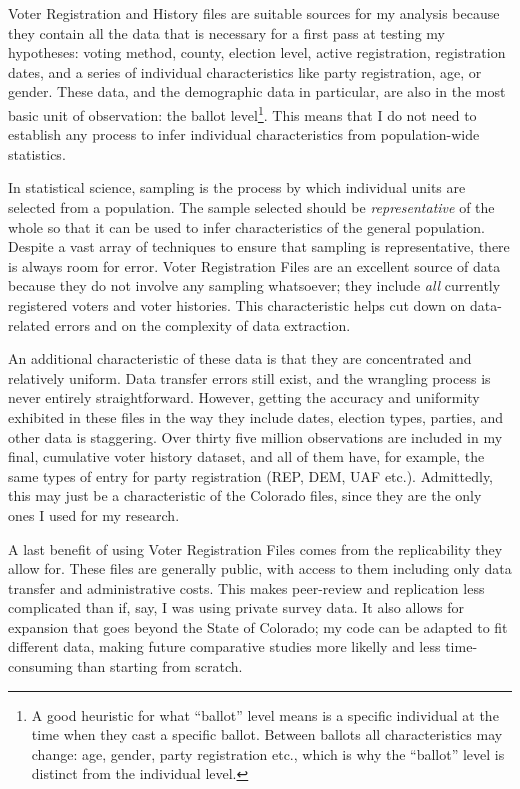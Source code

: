 \documentclass[12pt,twoside]{reedthesis}
\begin{document}
  Voter Registration and History files are suitable sources for my
  analysis because they contain all the data that is necessary for a first
  pass at testing my hypotheses: voting method, county, election level,
  active registration, registration dates, and a series of individual
  characteristics like party registration, age, or gender. These data, and
  the demographic data in particular, are also in the most basic unit of
  observation: the ballot level\footnote{A good heuristic for what
    ``ballot'' level means is a specific individual at the time when they
    cast a specific ballot. Between ballots all characteristics may
    change: age, gender, party registration etc., which is why the
    ``ballot'' level is distinct from the individual level.}. This means
  that I do not need to establish any process to infer individual
  characteristics from population-wide statistics.
  
  In statistical science, sampling is the process by which individual
  units are selected from a population. The sample selected should be
  \emph{representative} of the whole so that it can be used to infer
  characteristics of the general population. Despite a vast array of
  techniques to ensure that sampling is representative, there is always
  room for error. Voter Registration Files are an excellent source of data
  because they do not involve any sampling whatsoever; they include
  \emph{all} currently registered voters and voter histories. This
  characteristic helps cut down on data-related errors and on the
  complexity of data extraction.
  
  An additional characteristic of these data is that they are concentrated
  and relatively uniform. Data transfer errors still exist, and the
  wrangling process is never entirely straightforward. However, getting
  the accuracy and uniformity exhibited in these files in the way they
  include dates, election types, parties, and other data is staggering.
  Over thirty five million observations are included in my final,
  cumulative voter history dataset, and all of them have, for example, the
  same types of entry for party registration (REP, DEM, UAF etc.).
  Admittedly, this may just be a characteristic of the Colorado files,
  since they are the only ones I used for my research.
  
  A last benefit of using Voter Registration Files comes from the
  replicability they allow for. These files are generally public, with
  access to them including only data transfer and administrative costs.
  This makes peer-review and replication less complicated than if, say, I
  was using private survey data. It also allows for expansion that goes
  beyond the State of Colorado; my code can be adapted to fit different
  data, making future comparative studies more likelly and less
  time-consuming than starting from scratch.
  
\end{document}
